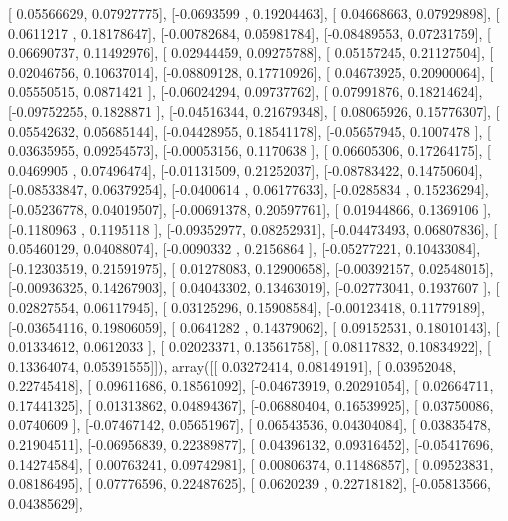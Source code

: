 \documentclass{article}
\begin{document}
       [ 0.05566629,  0.07927775],
       [-0.0693599 ,  0.19204463],
       [ 0.04668663,  0.07929898],
       [ 0.0611217 ,  0.18178647],
       [-0.00782684,  0.05981784],
       [-0.08489553,  0.07231759],
       [ 0.06690737,  0.11492976],
       [ 0.02944459,  0.09275788],
       [ 0.05157245,  0.21127504],
       [ 0.02046756,  0.10637014],
       [-0.08809128,  0.17710926],
       [ 0.04673925,  0.20900064],
       [ 0.05550515,  0.0871421 ],
       [-0.06024294,  0.09737762],
       [ 0.07991876,  0.18214624],
       [-0.09752255,  0.1828871 ],
       [-0.04516344,  0.21679348],
       [ 0.08065926,  0.15776307],
       [ 0.05542632,  0.05685144],
       [-0.04428955,  0.18541178],
       [-0.05657945,  0.1007478 ],
       [ 0.03635955,  0.09254573],
       [-0.00053156,  0.1170638 ],
       [ 0.06605306,  0.17264175],
       [ 0.0469905 ,  0.07496474],
       [-0.01131509,  0.21252037],
       [-0.08783422,  0.14750604],
       [-0.08533847,  0.06379254],
       [-0.0400614 ,  0.06177633],
       [-0.0285834 ,  0.15236294],
       [-0.05236778,  0.04019507],
       [-0.00691378,  0.20597761],
       [ 0.01944866,  0.1369106 ],
       [-0.1180963 ,  0.1195118 ],
       [-0.09352977,  0.08252931],
       [-0.04473493,  0.06807836],
       [ 0.05460129,  0.04088074],
       [-0.0090332 ,  0.2156864 ],
       [-0.05277221,  0.10433084],
       [-0.12303519,  0.21591975],
       [ 0.01278083,  0.12900658],
       [-0.00392157,  0.02548015],
       [-0.00936325,  0.14267903],
       [ 0.04043302,  0.13463019],
       [-0.02773041,  0.1937607 ],
       [ 0.02827554,  0.06117945],
       [ 0.03125296,  0.15908584],
       [-0.00123418,  0.11779189],
       [-0.03654116,  0.19806059],
       [ 0.0641282 ,  0.14379062],
       [ 0.09152531,  0.18010143],
       [ 0.01334612,  0.0612033 ],
       [ 0.02023371,  0.13561758],
       [ 0.08117832,  0.10834922],
       [ 0.13364074,  0.05391555]]), array([[ 0.03272414,  0.08149191],
       [ 0.03952048,  0.22745418],
       [ 0.09611686,  0.18561092],
       [-0.04673919,  0.20291054],
       [ 0.02664711,  0.17441325],
       [ 0.01313862,  0.04894367],
       [-0.06880404,  0.16539925],
       [ 0.03750086,  0.0740609 ],
       [-0.07467142,  0.05651967],
       [ 0.06543536,  0.04304084],
       [ 0.03835478,  0.21904511],
       [-0.06956839,  0.22389877],
       [ 0.04396132,  0.09316452],
       [-0.05417696,  0.14274584],
       [ 0.00763241,  0.09742981],
       [ 0.00806374,  0.11486857],
       [ 0.09523831,  0.08186495],
       [ 0.07776596,  0.22487625],
       [ 0.0620239 ,  0.22718182],
       [-0.05813566,  0.04385629],
\end{document}
